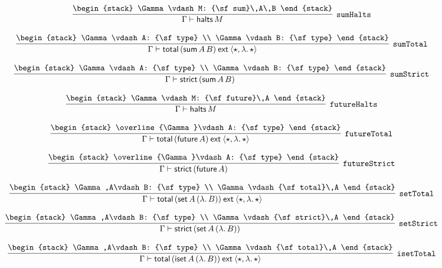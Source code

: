 \[
\infer[{\tt sumHalts}]{\Gamma \vdash {\sf halts}\,M}{
\begin{stack}
\Gamma \vdash M: {\sf sum}\,A\,B
\end{stack}}
\]

\[
\infer[{\tt sumTotal}]{\Gamma \vdash {\sf total}\,({\sf sum}\,A\,B)\:{\sf ext}\:\langle \star ,\lambda .\,\star \rangle }{
\begin{stack}
\Gamma \vdash A: {\sf type}
\\
\Gamma \vdash B: {\sf type}
\end{stack}}
\]

\[
\infer[{\tt sumStrict}]{\Gamma \vdash {\sf strict}\,({\sf sum}\,A\,B)}{
\begin{stack}
\Gamma \vdash A: {\sf type}
\\
\Gamma \vdash B: {\sf type}
\end{stack}}
\]

\[
\infer[{\tt futureHalts}]{\Gamma \vdash {\sf halts}\,M}{
\begin{stack}
\Gamma \vdash M: {\sf future}\,A
\end{stack}}
\]

\[
\infer[{\tt futureTotal}]{\Gamma \vdash {\sf total}\,({\sf future}\,A)\:{\sf ext}\:\langle \star ,\lambda .\,\star \rangle }{
\begin{stack}
\overline{\Gamma}\vdash A: {\sf type}
\end{stack}}
\]

\[
\infer[{\tt futureStrict}]{\Gamma \vdash {\sf strict}\,({\sf future}\,A)}{
\begin{stack}
\overline{\Gamma}\vdash A: {\sf type}
\end{stack}}
\]

\[
\infer[{\tt setTotal}]{\Gamma \vdash {\sf total}\,({\sf set}\,A\,(\lambda .\,B))\:{\sf ext}\:\langle \star ,\lambda .\,\star \rangle }{
\begin{stack}
\Gamma ,A\vdash B: {\sf type}
\\
\Gamma \vdash {\sf total}\,A
\end{stack}}
\]

\[
\infer[{\tt setStrict}]{\Gamma \vdash {\sf strict}\,({\sf set}\,A\,(\lambda .\,B))}{
\begin{stack}
\Gamma ,A\vdash B: {\sf type}
\\
\Gamma \vdash {\sf strict}\,A
\end{stack}}
\]

\[
\infer[{\tt isetTotal}]{\Gamma \vdash {\sf total}\,({\sf iset}\,A\,(\lambda .\,B))\:{\sf ext}\:\langle \star ,\lambda .\,\star \rangle }{
\begin{stack}
\Gamma ,A\vdash B: {\sf type}
\\
\Gamma \vdash {\sf total}\,A
\end{stack}}
\]

